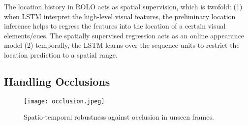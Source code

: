 \documentclass{article}
\begin{document}
The location history in ROLO acts as spatial supervision, which is twofold: (1) when LSTM interpret the high-level visual features, the preliminary location inference helps to regress the features into the location of a certain visual elements/cues. The spatially supervised regression acts as an online appearance model (2) temporally, the LSTM learns over the sequence units to restrict the location prediction to a spatial range.

\subsection{Handling Occlusions}
\begin{figure}[h] %
	\centering
	\captionsetup{justification=centering}
	\texttt{[image: occlusion.jpeg]}
	\caption{Spatio-temporal robustness against occlusion in unseen frames.}
	\label{fig-occlusion}
\end{figure}
\end{document}
